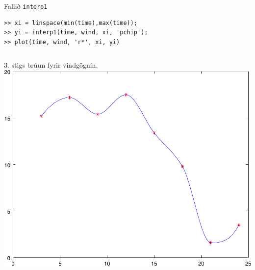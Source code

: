 \documentclass{beamer}
\begin{document}
\begin{frame}[fragile]{Fallið \texttt{interp1}}
\vspace{1cm}
\begin{verbatim}
>> xi = linspace(min(time),max(time));
>> yi = interp1(time, wind, xi, 'pchip');
>> plot(time, wind, 'r*', xi, yi)
\end{verbatim}
\begin{columns}
3. stigs brúun fyrir vindgögnin.
\includegraphics[width=\linewidth]{Pics/interp1-plot}
\end{columns}
\end{frame}
\end{document}
